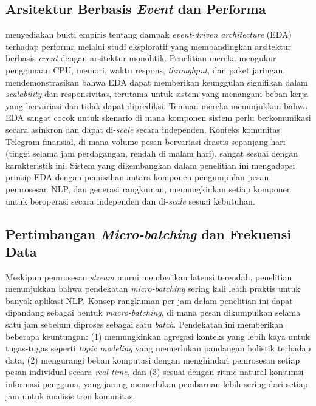 \subsection{Arsitektur Berbasis \textit{Event} dan Performa}

\textcite{rubert2023} menyediakan bukti empiris tentang dampak \textit{event-driven architecture} (EDA) terhadap performa melalui studi eksploratif yang membandingkan arsitektur berbasis \textit{event} dengan arsitektur monolitik. Penelitian mereka mengukur penggunaan CPU, memori, waktu respons, \textit{throughput}, dan paket jaringan, mendemonstrasikan bahwa EDA dapat memberikan keunggulan signifikan dalam \textit{scalability} dan responsivitas, terutama untuk sistem yang menangani beban kerja yang bervariasi dan tidak dapat diprediksi. Temuan mereka menunjukkan bahwa EDA sangat cocok untuk skenario di mana komponen sistem perlu berkomunikasi secara asinkron dan dapat di-\textit{scale} secara independen. Konteks komunitas Telegram finansial, di mana volume pesan bervariasi drastis sepanjang hari (tinggi selama jam perdagangan, rendah di malam hari), sangat sesuai dengan karakteristik ini. Sistem yang dikembangkan dalam penelitian ini mengadopsi prinsip EDA dengan pemisahan antara komponen pengumpulan pesan, pemrosesan NLP, dan generasi rangkuman, memungkinkan setiap komponen untuk beroperasi secara independen dan di-\textit{scale} sesuai kebutuhan.

\subsection{Pertimbangan \textit{Micro-batching} dan Frekuensi Data}

Meskipun pemrosesan \textit{stream} murni memberikan latensi terendah, penelitian menunjukkan bahwa pendekatan \textit{micro-batching} sering kali lebih praktis untuk banyak aplikasi NLP. Konsep rangkuman per jam dalam penelitian ini dapat dipandang sebagai bentuk \textit{macro-batching}, di mana pesan dikumpulkan selama satu jam sebelum diproses sebagai satu \textit{batch}. Pendekatan ini memberikan beberapa keuntungan: (1) memungkinkan agregasi konteks yang lebih kaya untuk tugas-tugas seperti \textit{topic modeling} yang memerlukan pandangan holistik terhadap data, (2) mengurangi beban komputasi dengan menghindari pemrosesan setiap pesan individual secara \textit{real-time}, dan (3) sesuai dengan ritme natural konsumsi informasi pengguna, yang jarang memerlukan pembaruan lebih sering dari setiap jam untuk analisis tren komunitas.

